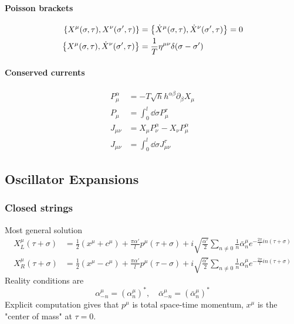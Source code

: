 \documentclass[12pt, a4paper, DIV=15]{article}
\numberwithin{equation}{section}
\begin{document}
\paragraph{Poisson brackets}
\begin{subequations}
\begin{align}
	\acomm{X^\mu(\sigma,\tau)}{X^\nu (\sigma',\tau)} &= \acomm{\dot{X}^\mu(\sigma,\tau)}{\dot{X}^\nu(\sigma',\tau)} = 0 \\
	\acomm{X^\mu(\sigma,\tau)}{\dot{X}^\nu(\sigma',\tau)} &= \frac{1}{T} \eta^{\mu\nu} \delta(\sigma - \sigma')
\end{align}
\label{math:PBs}
\end{subequations}

\paragraph{Conserved currents}
\begin{subequations}
\begin{align}
	P^\alpha_\mu &= - T \sqrt{h} h^{\alpha\beta} \partial_\beta X_\mu \\
	P_\mu &= \int_0^l \dd{\sigma} P^\tau_\mu \\
	J_{\mu\nu} &= X_\mu P^\alpha_\nu - X_\nu P^\alpha_\mu \\
	J_{\mu\nu} &= \int_0^l \dd{\sigma} J_{\mu\nu}^\tau
\end{align}
\end{subequations}

\subsection{Oscillator Expansions}
\subsubsection{Closed strings}
Most general solution
\begin{align}
	X_{L}^\mu (\tau + \sigma) &= \frac{1}{2} (x^\mu + c^\mu) + \frac{\pi \alpha'}{l} p^\mu (\tau + \sigma) + i \sqrt{\frac{\alpha'}{2}} \sum_{n \neq 0} \frac{1}{n} \bar{\alpha}_n^\mu e^{-\frac{2\pi}{l}	in (\tau+\sigma)} \\
	X_{R}^\mu (\tau + \sigma) &= \frac{1}{2} (x^\mu - c^\mu) + \frac{\pi \alpha'}{l} p^\mu (\tau - \sigma) + i \sqrt{\frac{\alpha'}{2}} \sum_{n \neq 0} \frac{1}{n} {\alpha}_n^\mu e^{-\frac{2\pi}{l}	in (\tau+\sigma)}
\end{align}
Reality conditions are
\begin{equation}
	\alpha^\mu_{-n} = (\alpha^\mu_n)^*, \quad \bar{\alpha}^{\mu}_{-n} = (\bar{\alpha}^\mu_n)^*
\end{equation}
Explicit computation gives that $p^\mu$ is total space-time momentum, $x^\mu$ is the "center of mass" at $\tau = 0$.
\end{document}
